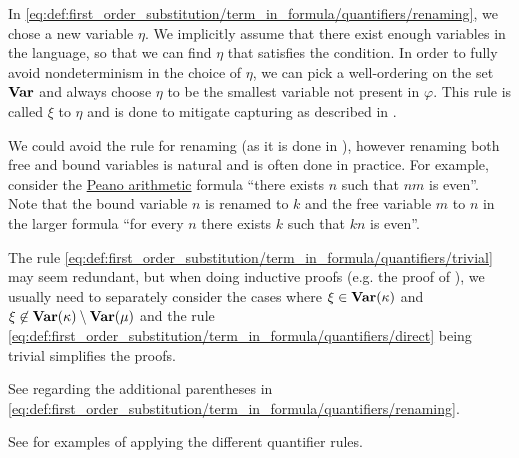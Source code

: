 \begin{definition}
\begin{thmenum}
    In \eqref{eq:def:first_order_substitution/term_in_formula/quantifiers/renaming}, we chose a new variable \( \eta \). We implicitly assume that there exist enough variables in the language, so that we can find \( \eta \) that satisfies the condition. In order to fully avoid nondeterminism in the choice of \( \eta \), we can pick a well-ordering on the set \( \operatorname{\mathbf{Var}} \) and always choose \( \eta \) to be the smallest variable not present in \( \varphi \). This rule is called  \( \xi \) to \( \eta \) and is done to mitigate capturing as described in .

    We could avoid the rule for renaming (as it is done in \cite[def. 15.25]{OpenLogicFull}), however renaming both free and bound variables is natural and is often done in practice. For example, consider the \hyperref[def:peano_arithmetic]{Peano arithmetic} formula \enquote{there exists \( n \) such that \( nm \) is even}. Note that the bound variable \( n \) is renamed to \( k \) and the free variable \( m \) to \( n \) in the larger formula \enquote{for every \( n \) there exists \( k \) such that \( kn \) is even}.

    The rule \eqref{eq:def:first_order_substitution/term_in_formula/quantifiers/trivial} may seem redundant, but when doing inductive proofs (e.g. the proof of ), we usually need to separately consider the cases where \( \xi \in \operatorname{\mathbf{Var}}(\kappa) \) and \( \xi \not\in \operatorname{\mathbf{Var}}(\kappa) \setminus \operatorname{\mathbf{Var}}(\mu) \) and the rule \eqref{eq:def:first_order_substitution/term_in_formula/quantifiers/direct} being trivial simplifies the proofs.

    See  regarding the additional parentheses in \eqref{eq:def:first_order_substitution/term_in_formula/quantifiers/renaming}.

    See  for examples of applying the different quantifier rules.
  \end{thmenum}
\end{definition}

